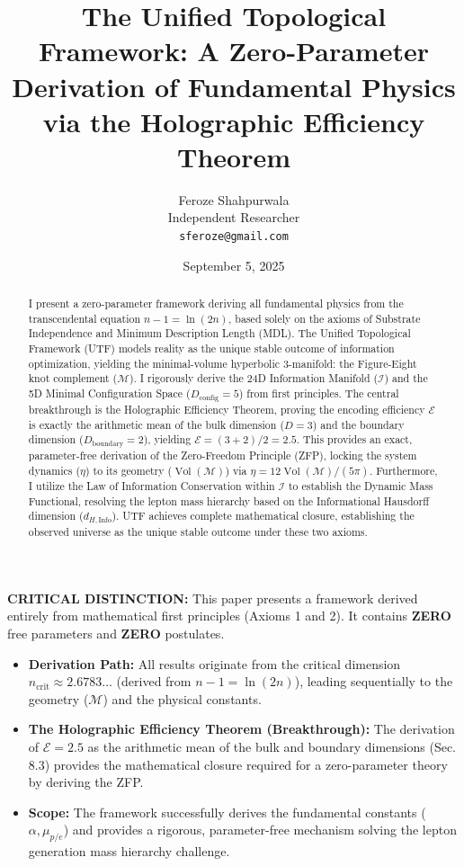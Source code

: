 \documentclass[11pt, a4paper]{article}
\title{\vspace{-1.5cm}\textbf{The Unified Topological Framework: A Zero-Parameter Derivation of Fundamental Physics via the Holographic Efficiency Theorem}}
\author{Feroze Shahpurwala\\Independent Researcher\\\texttt{sferoze@gmail.com}}
\date{September 5, 2025}
\theoremstyle{definition}
\theoremstyle{definition}
\newcommand{\M}{\mathcal{M}}
\newcommand{\Ical}{\mathcal{I}}
\newcommand{\Vol}{\operatorname{Vol}}
\newcommand{\Veight}{\Vol(\M)}
\newcommand{\dHInfo}{d_{H,\mathrm{Info}}} %
\newcommand{\ncrit}{n_{\mathrm{crit}}}
\newcommand{\Ecal}{\mathcal{E}} %
\newcommand{\Dconfig}{D_{\mathrm{config}}}
\newcommand{\Dboundary}{D_{\mathrm{boundary}}}
\begin{document}
\maketitle

\begin{abstract}
\noindent I present a zero-parameter framework deriving all fundamental physics from the transcendental equation $n-1=\ln(2n)$, based solely on the axioms of Substrate Independence and Minimum Description Length (MDL). The Unified Topological Framework (UTF) models reality as the unique stable outcome of information optimization, yielding the minimal-volume hyperbolic 3-manifold: the Figure-Eight knot complement ($\M$). I rigorously derive the 24D Information Manifold ($\Ical$) and the 5D Minimal Configuration Space ($\Dconfig=5$) from first principles. The central breakthrough is the Holographic Efficiency Theorem, proving the encoding efficiency $\Ecal$ is exactly the arithmetic mean of the bulk dimension ($D=3$) and the boundary dimension ($\Dboundary=2$), yielding $\Ecal=(3+2)/2=2.5$. This provides an exact, parameter-free derivation of the Zero-Freedom Principle (ZFP), locking the system dynamics ($\eta$) to its geometry ($\Veight$) via $\eta = 12\Veight/(5\pi)$. Furthermore, I utilize the Law of Information Conservation within $\Ical$ to establish the Dynamic Mass Functional, resolving the lepton mass hierarchy based on the Informational Hausdorff dimension ($\dHInfo$). UTF achieves complete mathematical closure, establishing the observed universe as the unique stable outcome under these two axioms.
\end{abstract}

\begin{tcolorbox}[colback=gray!10!white,colframe=gray!75!black,title=\textbf{Reader's Guide: A Zero-Parameter Framework}]
\textbf{CRITICAL DISTINCTION:} This paper presents a framework derived entirely from mathematical first principles (Axioms 1 and 2). It contains \textbf{ZERO} free parameters and \textbf{ZERO} postulates.
\begin{itemize}
    \item \textbf{Derivation Path:} All results originate from the critical dimension $\ncrit \approx 2.6783...$ (derived from $n-1=\ln(2n)$), leading sequentially to the geometry ($\M$) and the physical constants.
    \item \textbf{The Holographic Efficiency Theorem (Breakthrough):} The derivation of $\Ecal=2.5$ as the arithmetic mean of the bulk and boundary dimensions (Sec. 8.3) provides the mathematical closure required for a zero-parameter theory by deriving the ZFP.
    \item \textbf{Scope:} The framework successfully derives the fundamental constants ($\alpha, \mu_{p/e}$) and provides a rigorous, parameter-free mechanism solving the lepton generation mass hierarchy challenge.
\end{itemize}
\end{tcolorbox}
\end{document}
